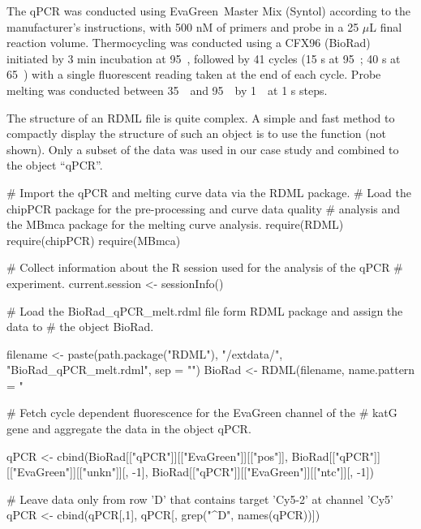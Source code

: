 The qPCR was conducted using EvaGreen\circledR~Master Mix (Syntol) according to 
the manufacturer's instructions, with 500 nM of primers and probe in a 25 $\mu$L 
final reaction volume. Thermocycling was conducted using a CFX96 (BioRad) 
initiated by 3 min incubation at 95~\textcelsius, followed by 41 cycles (15 s at 
95~\textcelsius; 40 s at 65~\textcelsius) with a single fluorescent reading 
taken at the end of each cycle. Probe melting was conducted between 
35~\textcelsius~and 95~\textcelsius~by 1~\textcelsius~at 1 s steps.

The structure of an RDML file is quite complex. A simple and fast method to 
compactly display the structure of such an object is to use the  
function (not shown). Only a subset of the data was used in our case study 
and combined to the object ``qPCR''.

\begin{example}
# Import the qPCR and melting curve data via the RDML package.
# Load the chipPCR package for the pre-processing and curve data quality
# analysis and the MBmca package for the melting curve analysis.
require(RDML)
require(chipPCR)
require(MBmca)

# Collect information about the R session used for the analysis of the qPCR
# experiment.
current.session <- sessionInfo()

# Load the BioRad_qPCR_melt.rdml file form RDML package and assign the data to 
# the object BioRad.

filename <- paste(path.package("RDML"), "/extdata/", 
		  "BioRad_qPCR_melt.rdml", sep = "")
BioRad <- RDML(filename, name.pattern = "%

# Fetch cycle dependent fluorescence for the EvaGreen channel of the 
# katG gene and aggregate the data in the object qPCR.

qPCR <- cbind(BioRad[["qPCR"]][["EvaGreen"]][["pos"]], 
	      BioRad[["qPCR"]][["EvaGreen"]][["unkn"]][, -1], 
	      BioRad[["qPCR"]][["EvaGreen"]][["ntc"]][, -1])
	      
# Leave data only from row 'D' that contains target 'Cy5-2' at channel 'Cy5'
qPCR <- cbind(qPCR[,1], qPCR[, grep("^D", names(qPCR))])
\end{example}

